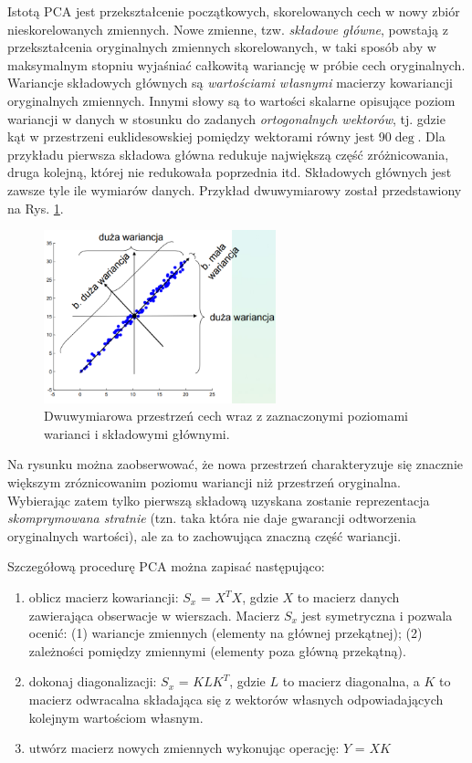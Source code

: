 Istotą PCA jest przekształcenie początkowych, skorelowanych cech w nowy zbiór nieskorelowanych zmiennych. Nowe zmienne, tzw. \textit{składowe główne}, powstają z przekształcenia oryginalnych zmiennych skorelowanych, w taki sposób aby w maksymalnym stopniu wyjaśniać całkowitą wariancję w próbie cech oryginalnych. Wariancje składowych głównych są \textit{wartościami własnymi} macierzy kowariancji oryginalnych zmiennych. Innymi słowy są to wartości skalarne opisujące poziom wariancji w danych w stosunku do zadanych \textit{ortogonalnych wektorów}, tj. gdzie kąt w przestrzeni euklidesowskiej pomiędzy wektorami równy jest 90$\deg$. Dla przykładu pierwsza składowa główna redukuje największą część zróżnicowania, druga kolejną, której nie redukowała poprzednia itd. Składowych głównych jest zawsze tyle ile wymiarów danych. Przykład dwuwymiarowy został przedstawiony na Rys. \ref{PCA-2dim}.
\begin{figure}[h!]
	\centering
	\includegraphics[width=0.6\textwidth]{figures/PCA.png}
	\caption{Dwuwymiarowa przestrzeń cech wraz z zaznaczonymi poziomami warianci i składowymi głównymi.}
	\label{PCA-2dim}
\end{figure}
Na rysunku można zaobserwować, że nowa przestrzeń charakteryzuje się znacznie większym zróznicowanim poziomu wariancji niż przestrzeń oryginalna. Wybierając zatem tylko pierwszą składową uzyskana zostanie reprezentacja \textit{skomprymowana stratnie} (tzn. taka która nie daje gwarancji odtworzenia oryginalnych wartości), ale za to zachowująca znaczną część wariancji.

Szczegółową procedurę PCA można zapisać następująco:
\begin{enumerate}
\item oblicz macierz kowariancji: $S_x$ = $X^{T}X$, gdzie $X$ to macierz danych zawierająca obserwacje w wierszach. Macierz $S_x$ jest symetryczna i pozwala ocenić: (1) wariancje zmiennych (elementy na głównej przekątnej); (2) zależności pomiędzy zmiennymi (elementy poza główną przekątną). 
\item dokonaj diagonalizacji: $S_x$ = $KLK^T$, gdzie $L$ to macierz diagonalna, a $K$ to macierz odwracalna składająca się z wektorów własnych odpowiadających kolejnym wartościom własnym.
\item utwórz macierz nowych zmiennych wykonując operację: $Y$ = $XK$
\end{enumerate}

